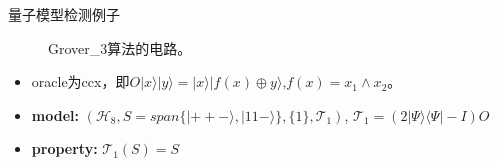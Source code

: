 \documentclass[aspectratio=1610]{ctexbeamer}
\begin{document}

\begin{frame}{量子模型检测例子}
    \begin{figure}[h]
        \centering
        \caption{Grover\_3算法的电路。}
        \label{fig:cir}
    \end{figure}
    \begin{itemize}
        \item oracle为ccx，即$O|x\rangle|y\rangle = |x\rangle|f(x)\oplus y\rangle $,$f(x)=x_1\wedge x_2$。
        \item \textbf{model:} $(\mathcal{H}_8, S = span\{|++-\rangle,|11-\rangle\}, \{1\}, {\mathcal{T}_1})$, $\mathcal{T}_1 =(2|\Psi\rangle\langle \Psi| - I)O$ 
        \item \textbf{property:} $\mathcal{T}_1(S)=S$
    \end{itemize}
\end{frame}
\end{document}
